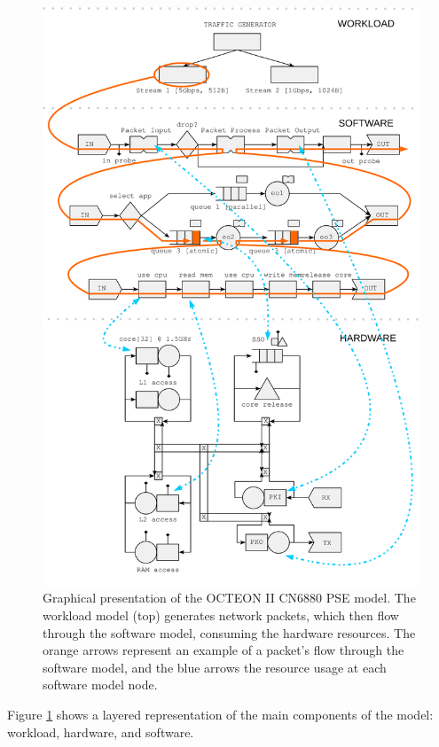 \begin{figure}[h]
  \begin{center}
    \includegraphics[width=\textwidth]{images/fullmodel-crop.pdf}
    \caption{Graphical presentation of the OCTEON II CN6880 PSE model. The workload model (top) generates network packets, which then flow through the software model, consuming the hardware resources. The orange arrows represent an example of a packet's flow through the software model, and the blue arrows the resource usage at each software model node.}
    \label{fig:full-model}
  \end{center}
\end{figure}

Figure \ref{fig:full-model} shows a layered representation of the main components of the model: workload, hardware, and software.

